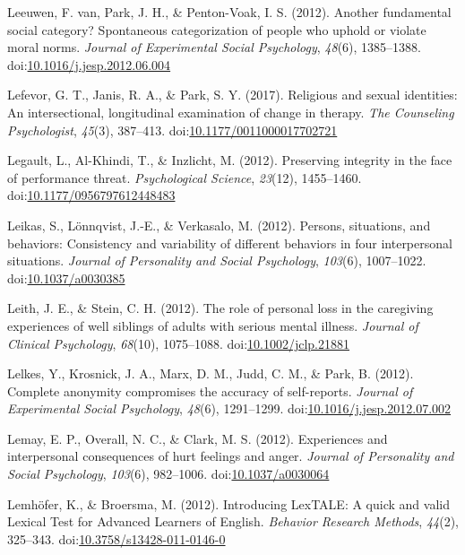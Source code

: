 \documentclass[english,man]{apa6}
\theoremstyle{definition}
\theoremstyle{definition}
\theoremstyle{definition}
\theoremstyle{remark}
\begin{document}
\hypertarget{ref-VanLeeuwen2012}{}
Leeuwen, F. van, Park, J. H., \& Penton-Voak, I. S. (2012). Another
fundamental social category? Spontaneous categorization of people who
uphold or violate moral norms. \emph{Journal of Experimental Social
Psychology}, \emph{48}(6), 1385--1388.
doi:\href{https://doi.org/10.1016/j.jesp.2012.06.004}{10.1016/j.jesp.2012.06.004}

\hypertarget{ref-Lefevor2017}{}
Lefevor, G. T., Janis, R. A., \& Park, S. Y. (2017). Religious and
sexual identities: An intersectional, longitudinal examination of change
in therapy. \emph{The Counseling Psychologist}, \emph{45}(3), 387--413.
doi:\href{https://doi.org/10.1177/0011000017702721}{10.1177/0011000017702721}

\hypertarget{ref-Legault2012}{}
Legault, L., Al-Khindi, T., \& Inzlicht, M. (2012). Preserving integrity
in the face of performance threat. \emph{Psychological Science},
\emph{23}(12), 1455--1460.
doi:\href{https://doi.org/10.1177/0956797612448483}{10.1177/0956797612448483}

\hypertarget{ref-Leikas2012}{}
Leikas, S., Lönnqvist, J.-E., \& Verkasalo, M. (2012). Persons,
situations, and behaviors: Consistency and variability of different
behaviors in four interpersonal situations. \emph{Journal of Personality
and Social Psychology}, \emph{103}(6), 1007--1022.
doi:\href{https://doi.org/10.1037/a0030385}{10.1037/a0030385}

\hypertarget{ref-Leith2012}{}
Leith, J. E., \& Stein, C. H. (2012). The role of personal loss in the
caregiving experiences of well siblings of adults with serious mental
illness. \emph{Journal of Clinical Psychology}, \emph{68}(10),
1075--1088.
doi:\href{https://doi.org/10.1002/jclp.21881}{10.1002/jclp.21881}

\hypertarget{ref-Lelkes2012}{}
Lelkes, Y., Krosnick, J. A., Marx, D. M., Judd, C. M., \& Park, B.
(2012). Complete anonymity compromises the accuracy of self-reports.
\emph{Journal of Experimental Social Psychology}, \emph{48}(6),
1291--1299.
doi:\href{https://doi.org/10.1016/j.jesp.2012.07.002}{10.1016/j.jesp.2012.07.002}

\hypertarget{ref-Lemay2012}{}
Lemay, E. P., Overall, N. C., \& Clark, M. S. (2012). Experiences and
interpersonal consequences of hurt feelings and anger. \emph{Journal of
Personality and Social Psychology}, \emph{103}(6), 982--1006.
doi:\href{https://doi.org/10.1037/a0030064}{10.1037/a0030064}

\hypertarget{ref-Lemhofer2012}{}
Lemhöfer, K., \& Broersma, M. (2012). Introducing LexTALE: A quick and
valid Lexical Test for Advanced Learners of English. \emph{Behavior
Research Methods}, \emph{44}(2), 325--343.
doi:\href{https://doi.org/10.3758/s13428-011-0146-0}{10.3758/s13428-011-0146-0}
\end{document}
